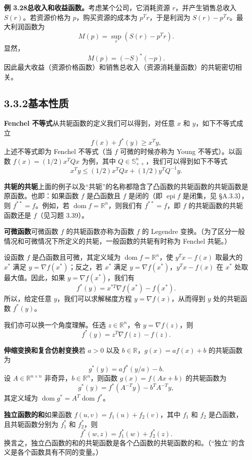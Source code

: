 \documentclass[UTF8, 12pt, fontset=fandol, oneside]{ctexart}
\DeclareMathOperator{\dom}{dom}
\DeclareMathOperator{\epi}{epi}
\begin{document}
\noindent\textbf{例 3.28\quad 总收入和收益函数。}\quad 考虑某个公司，它消耗资源 $r$，并产生销售总收入 $S(r)$。若资源价格为 $p$，购买资源的成本为 $p^Tr$，于是利润为 $S(r)-p^Tr$。最大利润函数为
\[
M(p)=\sup_r\left(S(r)-p^Tr\right).
\]
显然，
\[
M(p)=(-S)^*(-p).
\]
因此最大收益（资源价格函数）和销售总收入（资源消耗量函数）的共轭密切相关。

\subsection*{3.3.2\quad 基本性质}

\noindent\textbf{Fenchel 不等式}\quad 从共轭函数的定义我们可以得到，对任意 $x$ 和 $y$，如下不等式成立
\[
f(x)+f^*(y)\geq x^Ty,
\]
上述不等式即为 Fenchel 不等式（当 $f$ 可微的时候亦称为 Young 不等式）。以函数 $f(x)=(1/2)x^TQx$ 为例，其中 $Q\in\mathbb{S}_{++}^n$，我们可以得到如下不等式
\[
x^Ty\leq(1/2)x^TQx+(1/2)y^TQ^{-1}y.
\]

\noindent\textbf{共轭的共轭}\quad 上面的例子以及“共轭”的名称都隐含了凸函数的共轭函数的共轭函数是原函数。也即：如果函数 $f$ 是凸函数且 $f$ 是闭的（即 $\epi f$ 是闭集，见 \S A.3.3），则 $f^{**}=f$。例如，若 $\dom f=\mathbb{R}^n$，则我们有 $f^{**}=f$，即 $f$ 的共轭函数的共轭函数还是 $f$（见习题 3.39）。

\noindent\textbf{可微函数}\quad 可微函数 $f$ 的共轭函数亦称为函数 $f$ 的 Legendre 变换。（为了区分一般情况和可微情况下所定义的共轭，一般函数的共轭有时称为 Fenchel 共轭。）

设函数 $f$ 是凸函数且可微，其定义域为 $\dom f=\mathbb{R}^n$，使 $y^Tx-f(x)$ 取最大的 $x^*$ 满足 $y=\nabla f(x^*)$；反之，若 $x^*$ 满足 $y=\nabla f(x^*)$，$y^Tx-f(x)$ 在 $x^*$ 处取最大值。因此，如果 $y=\nabla f(x^*)$，我们有
\[
f^*(y)=x^{*T}\nabla f(x^*)-f(x^*).
\]
所以，给定任意 $y$，我们可以求解梯度方程 $y=\nabla f(x)$，从而得到 $y$ 处的共轭函数 $f^*(y)$。

我们亦可以换一个角度理解。任选 $z\in\mathbb{R}^n$，令 $y=\nabla f(z)$，则
\[
f^*(y)=z^T\nabla f(z)-f(z).
\]

\noindent\textbf{伸缩变换和复合仿射变换}\quad 若 $a>0$ 以及 $b\in\mathbb{R}$，$g(x)=af(x)+b$ 的共轭函数为
\[
g^*(y)=af^*(y/a)-b.
\]
设 $A\in\mathbb{R}^{n\times n}$ 非奇异，$b\in\mathbb{R}^n$，则函数 $g(x)=f(Ax+b)$ 的共轭函数为
\[
g^*(y)=f^*(A^{-T}y)-b^TA^{-T}y,
\]
其定义域为 $\dom g^*=A^T\dom f^*$。

\noindent\textbf{独立函数的和}\quad 如果函数 $f(u,v)=f_1(u)+f_2(v)$，其中 $f_1$ 和 $f_2$ 是凸函数，且共轭函数分别为 $f_1^*$ 和 $f_2^*$，则
\[
f^*(w,z)=f_1^*(w)+f_2^*(z).
\]
换言之，独立凸函数的和的共轭函数是各个凸函数的共轭函数的和。（“独立”的含义是各个函数具有不同的变量。）
\end{document}
